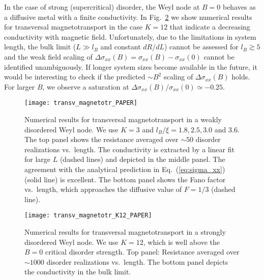\documentclass[aps,prb,10pt,amsmath,amssymb,twocolumn,floatfix,superscriptaddress,showpacs,numerical,footinbib]{revtex4-1}
\begin{document}
In the case of strong (supercritical) disorder, the Weyl node at $B=0$ behaves as a diffusive metal with a finite conductivity.\cite{Sbierski2014a} In Fig.~\ref{fig:strongDisorder} we show numerical results for transversal magnetotransport in the case $K=12$ that indicate a decreasing conductivity with magnetic field. Unfortunately, due to the limitations in system length, the bulk limit ($L\gg l_B$ and constant $dR/dL$) cannot be assessed for $l_B \gtrsim 5$ and the weak field scaling of $\Delta \sigma_{xx} (B)= \sigma_{xx}(B)-\sigma_{xx}(0)$ cannot be identified unambiguously. If longer system sizes become available in the future, it would be interesting to check if the predicted\cite{Klier2015} $\sim B^2$ scaling of $\Delta \sigma_{xx} (B)$ holds. For larger $B$, we observe a saturation at $\Delta \sigma_{xx} (B) / \sigma_{xx}(0) \simeq -0.25$.

\begin{figure}
\texttt{[image: transv\_magnetotr\_PAPER]}
\caption{\label{fig:weakDisorder} 
Numerical results for transversal magnetotransport in a weakly disordered Weyl node. We use $K=3$ and $l_B/\xi=1.8, 2.5, 3.0$ and $3.6$. The top panel shows the resistance averaged over $\sim\!50$ disorder realizations vs.\ length. The conductivity is extracted by a linear fit for large $L$ (dashed lines) and depicted in the middle panel. The agreement with the analytical prediction in Eq.~(\ref{eq:sigma_xx}) (solid line) is excellent. The bottom panel shows the Fano factor vs.\ length, which approaches the diffusive value of $F=1/3$ (dashed line).
}
\end{figure}

\begin{figure}
\texttt{[image: transv\_magnetotr\_K12\_PAPER]}
\caption{\label{fig:strongDisorder} 
Numerical results for transversal magnetotransport in a strongly disordered Weyl node. We use $K=12$, which is well above the $B=0$ critical disorder strength. Top panel: Resistance averaged over $\sim\!1000$ disorder realizations vs.\ length. The bottom panel depicts the conductivity in the bulk limit.
}
\end{figure}
\end{document}
